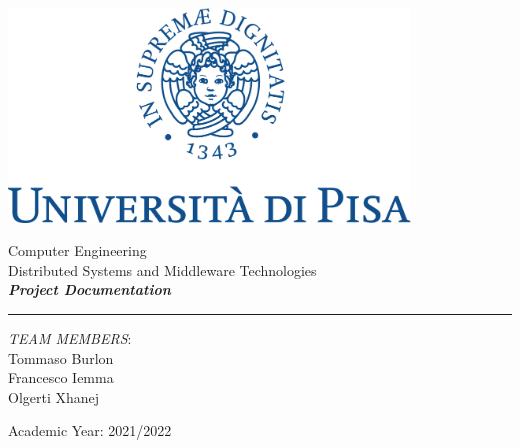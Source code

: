 \documentclass[12pt]{article}
\begin{document}
	
	
	\begin{titlepage}
		\begin{center}
			
			\begin{center}
				\includegraphics[width=0.8\textwidth]{img/marchio_unipi_pant541-eps-converted-to.pdf}         
			\end{center}
			{\Large
				\vspace{15mm}
				Computer Engineering\\
				\vspace{5mm}
				Distributed Systems and Middleware Technologies}\\
			\vspace{30mm} 
			{\Huge\textbf{\textit{Project Documentation}}}\\
			\vspace{70mm} 
			\par\noindent\rule{\textwidth}{0.4pt}
			\begin{flushright}
				\textit{TEAM MEMBERS}:\\
				Tommaso Burlon\\
				Francesco Iemma\\
				Olgerti Xhanej\\
			\end{flushright}
			\vfill
			Academic Year: 2021/2022\\        
		\end{center}
	\end{titlepage} 

	\tableofcontents
	
	
\end{document}
